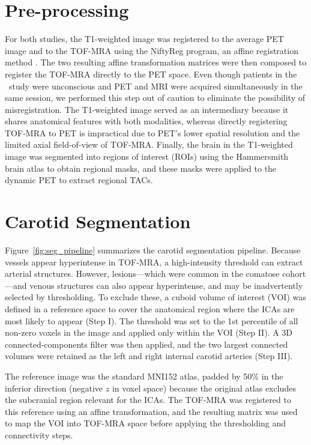 \section{Pre-processing}
For both studies, the T1-weighted image was registered to the average PET image and to the TOF-MRA using the NiftyReg program, an affine registration method \cite{modat2014global}.
The two resulting affine transformation matrices were then composed to register the TOF-MRA directly to the PET space.
Even though patients in the \fdg\ study were unconscious and PET and MRI were acquired simultaneously in the same session, we performed this step out of caution to eliminate the possibility of misregistration.
The T1-weighted image served as an intermediary because it shares anatomical features with both modalities, whereas directly registering TOF-MRA to PET is impractical due to PET’s lower spatial resolution and the limited axial field-of-view of TOF-MRA.
Finally, the brain in the T1-weighted image was segmented into regions of interest (ROIs) using the Hammersmith brain atlas \cite{hammers2003three} to obtain regional masks, and these masks were applied to the dynamic PET to extract regional TACs.


\section{Carotid Segmentation\label{sec:carotid}}
Figure~\ref{fig:seg_pipeline} summarizes the carotid segmentation pipeline.
Because vessels appear hyperintense in TOF-MRA, a high-intensity threshold can extract arterial structures.
However, lesions—which were common in the comatose cohort—and venous structures can also appear hyperintense, and may be inadvertently selected by thresholding.
To exclude these, a cuboid volume of interest (VOI) was defined in a reference space to cover the anatomical region where the ICAs are most likely to appear (Step I).
The threshold was set to the 1st percentile of all non-zero voxels in the image and applied only within the VOI (Step II).
A 3D connected-components filter was then applied, and the two largest connected volumes were retained as the left and right internal carotid arteries (Step III).

The reference image was the standard MNI152 atlas, padded by 50\% in the inferior direction (negative \(z\) in voxel space) because the original atlas excludes the subcranial region relevant for the ICAs.
The TOF-MRA was registered to this reference using an affine transformation, and the resulting matrix was used to map the VOI into TOF-MRA space before applying the thresholding and connectivity steps.

